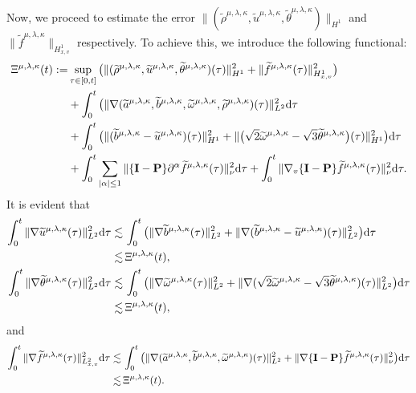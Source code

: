 \documentclass[reqno,11pt]{amsart}
\theoremstyle{plain}
\numberwithin{equation}{section}
\begin{document}
Now, we proceed to estimate the error $\|(\widetilde{\rho}^{\mu,\lambda,\kappa},\widetilde{u}^{\mu,\lambda,\kappa},\widetilde{\theta}^{\mu,\lambda,\kappa})\|_{H^1}$ and $\|\widetilde{f}^{\mu,\lambda,\kappa}\|_{H_{x,v}^1}$ respectively. 
To achieve this, we introduce the following functional:  
\begin{align}\label{G4.4}  
{\Xi} ^{\mu,\lambda,\kappa}(t) :=&\sup_{\tau\in[0,t]}\big(\|(\widetilde{\rho}^{\mu,\lambda,\kappa},\widetilde{u}^{\mu,\lambda,\kappa} ,\widetilde{\theta}^{\mu,\lambda,\kappa})(\tau)\|_{H^1}^2 +\|\widetilde{f}^{\mu,\lambda,\kappa}(\tau)\|_{H_{x,v}^1}^2\big) \nonumber\\
&+\int_{0}^t\big( \|\nabla(\widetilde{a}^{\mu,\lambda,\kappa},\widetilde{b}^{\mu,\lambda,\kappa},\widetilde{\omega}^{\mu,\lambda,\kappa},\widetilde{\rho}^{\mu,\lambda,\kappa})(\tau)\|_{L^2}^2 {\rm d}\tau\nonumber\\  
&+\int_{0}^t\big(   \|(\widetilde{b}^{\mu,\lambda,\kappa}-\widetilde{u}^{\mu,\lambda,\kappa})(\tau)\|_{H^1}^2 + \|\big(\sqrt{2}\widetilde{\omega}^{\mu,\lambda,\kappa}-\sqrt{3}\widetilde{\theta}^{\mu,\lambda,\kappa}\big)(\tau)\|_{H^1}^2 \big){\rm d}\tau\nonumber\\  
&+\int_0^t\sum_{|\alpha|\leq 1}\|\{\mathbf{I}-\mathbf{P}\}\partial^\alpha\widetilde{f}^{\mu,\lambda,\kappa}(\tau)\|_{\nu}^2{\rm d}\tau+\int_0^t \|\nabla_v \{\mathbf{I}-\mathbf{P}\}\widetilde{f}^{\mu,\lambda,\kappa}(\tau)\|_{\nu}^2{\rm d}\tau.  
\end{align}  
It is evident that  
\begin{align}\label{LNXG4.5}  
\int_0^t \|\nabla \widetilde{u}^{\mu,\lambda,\kappa}(\tau)\|_{L^2}^2 {\rm d}\tau
\lesssim&\, \int_0^t\big( \|\nabla \widetilde{b}^{\mu,\lambda,\kappa}(\tau)\|_{L^2}^2+\|\nabla(  \widetilde{b}^{\mu,\lambda,\kappa}- \widetilde{u}^{\mu,\lambda,\kappa})(\tau)\|_{L^2}^2 \big){\rm d}\tau \nonumber\\
\lesssim&\, {\Xi} ^{\mu,\lambda,\kappa}(t), \\ \label{G4.5}
 \int_0^t \|\nabla \widetilde{\theta}^{\mu,\lambda,\kappa}(\tau)\|_{L^2}^2 {\rm d}\tau  
\lesssim &\,
\int_0^t\big( \|\nabla \widetilde{\omega}^{\mu,\lambda,\kappa}(\tau)\|_{L^2}^2+\|\nabla(\sqrt{2} \widetilde{\omega}^{\mu,\lambda,\kappa}-\sqrt{3}\widetilde{\theta}^{\mu,\lambda,\kappa})(\tau)\|_{L^2}^2 \big){\rm d}\tau\nonumber\\
\lesssim&\, {\Xi} ^{\mu,\lambda,\kappa}(t),  
\end{align} 
and  
\begin{align}\label{G4.6}  
\int_0^t \|\nabla \widetilde{f}^{\mu,\lambda,\kappa}(\tau)\|_{L_{x,v}^2}^2 {\rm d}\tau \lesssim&\, \int_0^t\big( \|\nabla (\widetilde{a}^{\mu,\lambda,\kappa},\widetilde{b}^{\mu,\lambda,\kappa},\widetilde{\omega}^{\mu,\lambda,\kappa})(\tau)\|_{L^2}^2+ \|\nabla \{\mathbf{I}-\mathbf{P}\}\widetilde{f}^{\mu,\lambda,\kappa}(\tau)\|_{\nu}^2\big){\rm d}\tau\nonumber\\
\lesssim&\,{\Xi} ^{\mu,\lambda,\kappa}(t).  
\end{align}   
\end{document}
